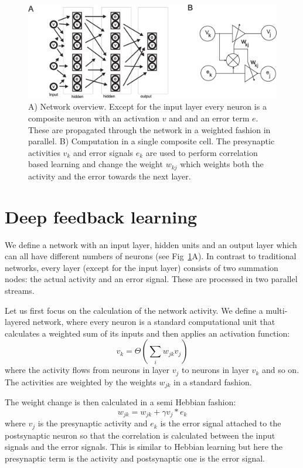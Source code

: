 \documentclass{llncs}
\begin{document}
\begin{figure}[h!]
  \centering
  \includegraphics[width=\columnwidth]{netw_together}
  \caption{A) Network overview. Except for the input layer
    every neuron is a composite neuron with an activation $v$ and
    and an error term $e$. These are propagated through the network
    in a weighted fashion in parallel.
B) Computation in a single composite cell.
    The presynaptic activities $v_k$ and error signals $e_k$ are used
    to perform correlation based learning and change the weight $w_{kj}$
    which weights both the activity and the error towards the next
    layer.\label{netw_together}}
\end{figure}


\section{Deep feedback learning}
We define a network with an input layer, hidden units and an output
layer which can all have different numbers of neurons (see
Fig~\ref{netw_together}A). In contrast to traditional
networks, every layer (except for the input layer) consists of two
summation nodes: the actual activity and an error signal. These
are processed in two parallel streams.

Let us first focus on the calculation of the network activity. We define a multi-layered network, where every neuron is a standard computational unit that calculates
a weighted sum of its inputs and then applies an activation
function:
\begin{equation}
  v_k = \Theta\left( \sum_i w_{jk} v_{j} \right) \label{act_sum}
\end{equation}
where the activity flows from neurons in layer $v_j$ to neurons in layer $v_k$
and so on. The activities are weighted by the weights $w_{jk}$
in a standard fashion.

The weight change is then calculated in a semi Hebbian fashion:
\begin{equation}
  w_{jk} = w_{jk} + \gamma v_j * e_k
\end{equation}
where $v_j$ is the presynaptic activity and $e_k$ is the error signal
attached to the postsynaptic neuron so that the correlation is
calculated between the input signals and the error signals. This is similar
to Hebbian learning but here the presynaptic term is the activity
and postsynaptic one is the error signal.
\end{document}
